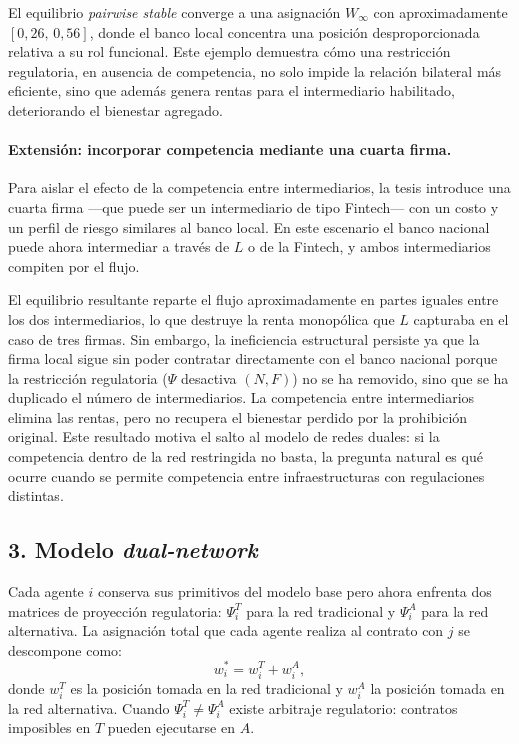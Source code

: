 \documentclass[12pt,a4paper]{article}
\begin{document}
El equilibrio \textit{pairwise stable} converge a una asignación $W_\infty$ con aproximadamente
$[0{,}26,\, 0{,}56]$, donde el banco local concentra una posición desproporcionada relativa a
su rol funcional. Este ejemplo demuestra cómo una restricción regulatoria, en ausencia de
competencia, no solo impide la relación bilateral más eficiente, sino que además genera rentas
para el intermediario habilitado, deteriorando el bienestar agregado.

\paragraph{Extensión: incorporar competencia mediante una cuarta firma.}
Para aislar el efecto de la competencia entre intermediarios, la tesis introduce una cuarta firma
—que puede ser un intermediario de tipo Fintech— con un costo y un perfil de riesgo similares
al banco local. En este escenario el banco nacional puede ahora intermediar a través de $L$ o
de la Fintech, y ambos intermediarios compiten por el flujo.

El equilibrio resultante reparte el flujo aproximadamente en partes iguales entre los dos
intermediarios, lo que destruye la renta monopólica que $L$ capturaba en el caso de tres
firmas. Sin embargo, la ineficiencia estructural persiste ya que la firma local sigue sin poder
contratar directamente con el banco nacional porque la restricción regulatoria ($\Psi$ desactiva
$(N, F)$) no se ha removido, sino que se ha duplicado el número de intermediarios. La
competencia entre intermediarios elimina las rentas, pero no recupera el bienestar perdido por
la prohibición original. Este resultado motiva el salto al modelo de redes duales: si la
competencia dentro de la red restringida no basta, la pregunta natural es qué ocurre cuando se
permite competencia entre infraestructuras con regulaciones distintas.

\subsection*{3. Modelo \textit{dual-network}}

Cada agente $i$ conserva sus primitivos del modelo base pero ahora enfrenta dos matrices de
proyección regulatoria: $\Psi^T_i$ para la red tradicional y $\Psi^A_i$ para la red alternativa. La
asignación total que cada agente realiza al contrato con $j$ se descompone como:
\begin{equation}
    w_i^* = w^T_i + w^A_i,
\end{equation}
donde $w^T_i$ es la posición tomada en la red tradicional y $w^A_i$ la posición tomada en la red
alternativa. Cuando $\Psi^T_i \neq \Psi^A_i$ existe arbitraje regulatorio: contratos imposibles en
$T$ pueden ejecutarse en $A$.
\end{document}
